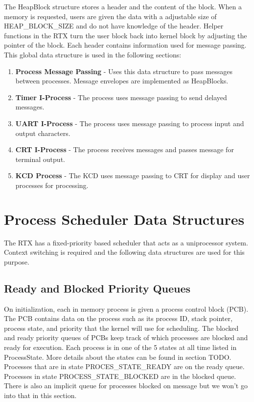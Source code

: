 \documentclass[12pt]{report}
\begin{document}
The HeapBlock structure stores a header and the content of the block. When a memory is requested, users are given the data with a adjustable size of HEAP\_BLOCK\_SIZE and do not have knowledge of the header. Helper functions in the RTX turn the user block back into kernel block by adjusting the pointer of the block. Each header contains information used for message passing. This global data structure is used in the following sections:
\begin{enumerate}
    \item {\bf Process Message Passing} - Uses this data structure to pass messages between processes. Message envelopes are implemented as HeapBlocks.
    \item {\bf Timer I-Process} - The process uses message passing to send delayed messages.
    \item {\bf UART I-Process} - The process uses message passing to process input and output characters.
    \item {\bf CRT I-Process} - The process receives messages and passes message for terminal output.
    \item {\bf KCD Process} - The KCD uses message passing to CRT for display and user processes for processing.
\end{enumerate}


\section{Process Scheduler Data Structures}
The RTX has a fixed-priority based scheduler that acts as a uniprocessor system. Context switching is required and the following data structures are used for this purpose.

\subsection{Ready and Blocked Priority Queues}
On initialization, each in memory process is given a process control block (PCB). The PCB contains data on the process such as its process ID, stack pointer, process state, and priority that the kernel will use for scheduling. The blocked and ready priority queues of PCBs keep track of which processes are blocked and ready for execution. Each process is in one of the 5 states at all time listed in ProcessState. More details about the states can be found in section TODO. Processes that are in state PROCES\_STATE\_READY are on the ready queue. Processes in state PROCESS\_STATE\_BLOCKED are in the blocked queue. There is also an implicit queue for processes blocked on message but we won't go into that in this section.
\end{document}
